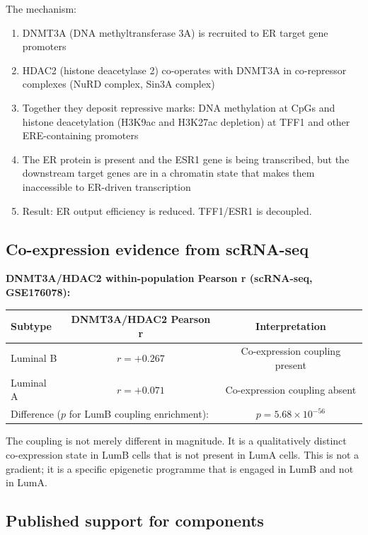\documentclass[12pt, a4paper]{article}
\begin{document}
\noindent
The mechanism:
\begin{enumerate}[noitemsep]
  \item DNMT3A (DNA methyltransferase 3A) is recruited
        to ER target gene promoters
  \item HDAC2 (histone deacetylase 2) co-operates
        with DNMT3A in co-repressor complexes
        (NuRD complex, Sin3A complex)
  \item Together they deposit repressive marks:
        DNA methylation at CpGs and histone
        deacetylation (H3K9ac and H3K27ac depletion)
        at TFF1 and other ERE-containing promoters
  \item The ER protein is present and the ESR1 gene
        is being transcribed, but the downstream
        target genes are in a chromatin state that
        makes them inaccessible to ER-driven
        transcription
  \item Result: ER output efficiency is reduced.
        TFF1/ESR1 is decoupled.
\end{enumerate}

\subsection{Co-expression evidence from scRNA-seq}

\noindent
\textbf{DNMT3A/HDAC2 within-population Pearson r
(scRNA-seq, GSE176078):}

\begin{center}
\begin{tabular}{lcc}
\toprule
\textbf{Subtype} & \textbf{DNMT3A/HDAC2 Pearson r}
& \textbf{Interpretation} \\
\midrule
Luminal B
& $r = +0.267$
& Co-expression coupling present \\
Luminal A
& $r = +0.071$
& Co-expression coupling absent \\
\midrule
\multicolumn{2}{l}{Difference ($p$ for LumB coupling
  enrichment):}
& $p = 5.68\times10^{-56}$ \\
\bottomrule
\end{tabular}
\end{center}

\noindent
The coupling is not merely different in magnitude.
It is a qualitatively distinct co-expression state
in LumB cells that is not present in LumA cells.
This is not a gradient; it is a specific epigenetic
programme that is engaged in LumB and not in LumA.

\subsection{Published support for components}
\end{document}
